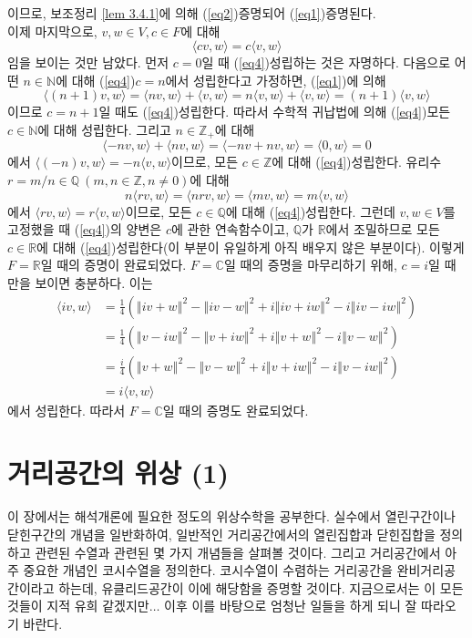 \documentclass[11pt]{book}
\numberwithin{equation}{chapter}
\def\NN{\mathbb{N}}
\def\ZZ{\mathbb{Z}}
\def\QQ{\mathbb{Q}}
\def\RR{\mathbb{R}}
\def\CC{\mathbb{C}}
\newcommand{\inner}[2]{\langle#1, #2\rangle}
\newcommand{\norm}[1]{\left\Vert#1\right\Vert}
\theoremstyle{definition}
\begin{document}
이므로, 보조정리 \ref{lem 3.4.1}에 의해 (\ref{eq2})\가 증명되어 (\ref{eq1})\이 증명된다.\\
이제 마지막으로, \(v, w \in V, c \in F\)에 대해
\begin{equation} \label{eq4}
    \inner{cv}{w} = c\inner{v}{w}
\end{equation}
임을 보이는 것만 남았다. 먼저 \(c = 0\)일 때 (\ref{eq4})\가 성립하는 것은 자명하다. 다음으로 어떤 \(n \in \NN\)에 대해 (\ref{eq4})\가 \(c = n\)에서 성립한다고 가정하면, (\ref{eq1})에 의해
\[
\inner{(n+1)v}{w} = \inner{nv}{w} + \inner{v}{w} = n\inner{v}{w} + \inner{v}{w} = (n+1)\inner{v}{w}    
\]
이므로 \(c = n+1\)일 때도 (\ref{eq4})\가 성립한다. 따라서 수학적 귀납법에 의해 (\ref{eq4})\는 모든 \(c \in \NN\)에 대해 성립한다. 그리고 \(n \in \ZZ_+\)에 대해
\[
    \inner{-nv}{w} + \inner{nv}{w} = \inner{-nv + nv}{w} = \inner{0}{w} = 0
\]
에서 \(\inner{(-n)v}{w} = -n\inner{v}{w}\)이므로, 모든 \(c \in \ZZ\)에 대해 (\ref{eq4})\가 성립한다. 유리수 \(r = m/n \in \QQ \ (m, n \in \ZZ, n \ne 0)\)에 대해
\[
    n\inner{rv}{w} = \inner{nrv}{w} = \inner{mv}{w} = m\inner{v}{w}
\]
에서 \(\inner{rv}{w} = r\inner{v}{w}\)이므로, 모든 \(c \in \QQ\)에 대해 (\ref{eq4})\가 성립한다. 그런데 \(v, w \in V\)를 고정했을 때 (\ref{eq4})의 양변은 \(c\)에 관한 연속함수이고, \(\QQ\)가 \(\RR\)에서 조밀하므로 모든 \(c \in \RR\)에 대해 (\ref{eq4})\가 성립한다(이 부분이 유일하게 아직 배우지 않은 부분이다). 이렇게 \(F = \RR\)일 때의 증명이 완료되었다. \(F = \CC\)일 때의 증명을 마무리하기 위해, \(c = i\)일 때만을 보이면 충분하다. 이는
    \begin{align*}
        \inner{iv}{w} &= \frac{1}{4}(\norm{iv+w}^2 - \norm{iv-w}^2 + i\norm{iv+iw}^2 -i\norm{iv-iw}^2)\\
        &= \frac{1}{4}(\norm{v-iw}^2 - \norm{v+iw}^2 + i\norm{v+w}^2 -i\norm{v-w}^2)\\
        &= \frac{i}{4}(\norm{v+w}^2 - \norm{v-w}^2 +i\norm{v+iw}^2 -i\norm{v-iw}^2)\\
        &= i\inner{v}{w}
    \end{align*}
에서 성립한다. 따라서 \(F = \CC\)일 때의 증명도 완료되었다.



\chapter{거리공간의 위상 (1)}

이 장에서는 해석개론에 필요한 정도의 위상수학을 공부한다. 실수에서 열린구간이나 닫힌구간의 개념을 일반화하여, 일반적인 거리공간에서의 열린집합과 닫힌집합을 정의하고 관련된 수열과 관련된 몇 가지 개념들을 살펴볼 것이다. 그리고 거리공간에서 아주 중요한 개념인 코시수열을 정의한다. 코시수열이 수렴하는 거리공간을 완비거리공간이라고 하는데, 유클리드공간이 이에 해당함을 증명할 것이다. 지금으로서는 이 모든 것들이 지적 유희 같겠지만\(\ldots\) 이후 이를 바탕으로 엄청난 일들을 하게 되니 잘 따라오기 바란다.
\end{document}
